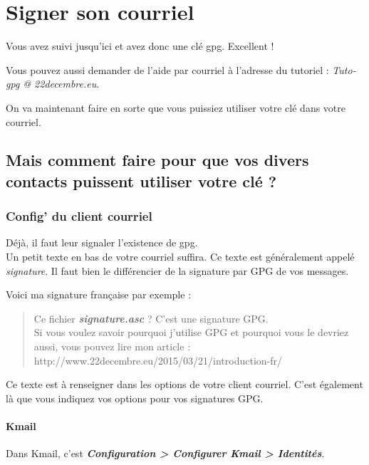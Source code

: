 \chapter{Signer son courriel}

Vous avez suivi jusqu'ici et avez donc une clé gpg. Excellent !

Vous pouvez aussi demander de l'aide par courriel à l'adresse du
tutoriel : \emph{Tuto-gpg @ 22decembre.eu}.

On va maintenant faire en sorte que vous puissiez utiliser votre clé
dans votre courriel.

\section{Mais comment faire pour que vos divers contacts puissent utiliser votre clé ?}\label{mais-comment-faire-pour-que-vos-divers-contacts-puissent-utiliser-votre-cluxe9}

\subsection{Config' du client courriel}\label{config-du-client-courriel}

Déjà, il faut leur signaler l'existence de gpg.\\Un petit texte en bas
de votre courriel suffira. Ce texte est généralement appelé
\emph{signature}. Il faut bien le différencier de la signature par GPG
de vos messages.

Voici ma signature française par exemple :

\begin{quote}
Ce fichier \textbf{\emph{signature.asc}} ? C'est une signature GPG.\\Si
vous voulez savoir pourquoi j'utilise GPG et pourquoi vous le devriez
aussi, vous pouvez lire mon article
:\\http://www.22decembre.eu/2015/03/21/introduction-fr/
\end{quote}

Ce texte est à renseigner dans les options de votre client courriel.
C'est également là que vous indiquez vos options pour vos signatures
GPG.

\subsubsection{Kmail}\label{kmail}

Dans Kmail, c'est \textbf{\emph{Configuration \textgreater{} Configurer
Kmail \textgreater{} Identités}}.

